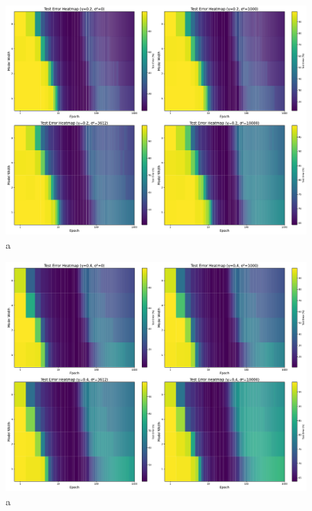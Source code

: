 \begin{figure}[H]
    \centering
    \includegraphics[width=\linewidth]{fig/heatmap_ln/ln0.2.pdf}
    \caption{a}
    \label{fig:modelwidth_heatmap_0.2}
\end{figure}

\begin{figure}[H]
    \centering
    \includegraphics[width=\linewidth]{fig/heatmap_ln/ln0.4.pdf}
    \caption{a}
    \label{fig:modelwidth_heatmap_0.4}
\end{figure}

